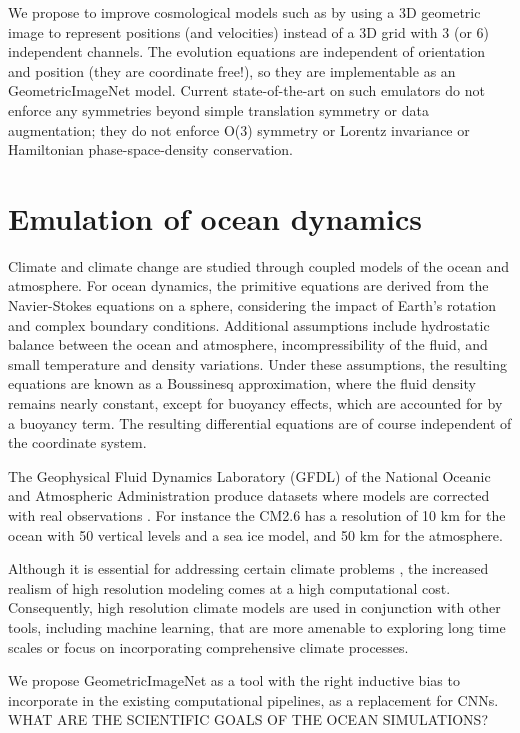 \documentclass[11pt]{article}
\begin{document}
We propose to improve cosmological models such as \cite{li2021ai, ni2021ai} by using a 3D geometric image to represent positions (and velocities) instead of a 3D grid with 3 (or 6) independent channels. The evolution equations are independent of orientation and position (they are coordinate free!), so they are implementable as an GeometricImageNet model. Current state-of-the-art on such emulators do not enforce any symmetries beyond simple translation symmetry or data augmentation; they do not enforce O(3) symmetry or Lorentz invariance or Hamiltonian phase-space-density conservation.

\section{Emulation of ocean dynamics}

Climate and climate change are studied through coupled models of the ocean and atmosphere. For ocean dynamics, the primitive equations are derived from the Navier-Stokes equations on a sphere, considering the impact of Earth's rotation and complex boundary conditions. Additional assumptions include hydrostatic balance between the ocean and atmosphere, incompressibility of the fluid, and small temperature and density variations. Under these assumptions, the resulting equations are known as a Boussinesq approximation, where the fluid density remains nearly constant, except for buoyancy effects, which are accounted for by a buoyancy term. The resulting differential equations are of course independent of the coordinate system.

The Geophysical Fluid Dynamics Laboratory (GFDL) of the National Oceanic and Atmospheric Administration produce datasets where models are corrected with real observations \cite{obrien2004gfdl, rutledge2006nomads, delworth2020spear}. 
For instance the CM2.6 has a resolution of 10 km for the ocean with 50 vertical levels and a sea ice model, and 50 km for the atmosphere. 

Although it is essential for addressing certain climate problems \cite{jong2023increases, pascale2020increasing, zhou2019toward}, the increased realism of high resolution modeling comes at a high computational cost. Consequently, high resolution climate models are used in conjunction with other tools, including machine learning, that are more amenable to exploring long time scales or focus on incorporating comprehensive climate processes. 

We propose GeometricImageNet as a tool with the right inductive bias to incorporate in the existing computational pipelines, as a replacement for CNNs. WHAT ARE THE SCIENTIFIC GOALS OF THE OCEAN SIMULATIONS?
\end{document}
